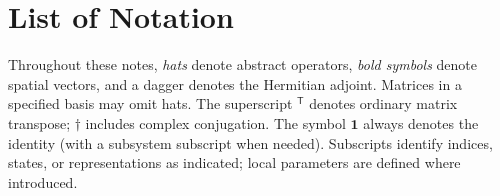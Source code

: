 \chapter*{List of Notation}

\begingroup
\small
\noindent Throughout these notes, \emph{hats} denote abstract operators, \emph{bold symbols}
denote spatial vectors, and a dagger denotes the Hermitian adjoint.
Matrices in a specified basis may omit hats. The superscript $^{\mathsf T}$ denotes
ordinary matrix transpose; $\dagger$ includes complex conjugation. The symbol
$\mathbf1$ always denotes the identity (with a subsystem subscript when needed).
Subscripts identify indices, states, or representations as indicated;
local parameters are defined where introduced.

